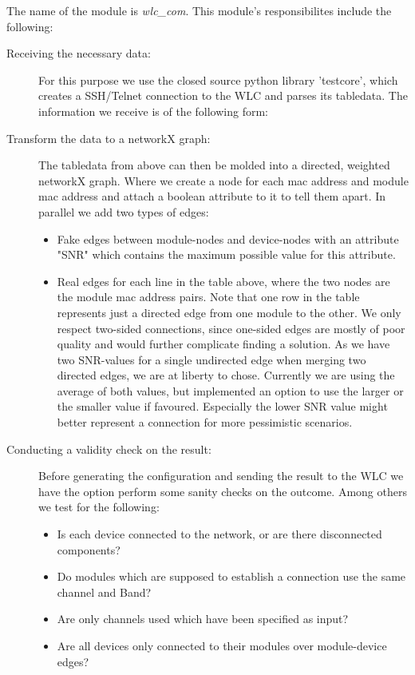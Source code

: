       The name of the module is \textit{wlc\_com}. This module's responsibilites include the following:
      \begin{description}
	\item[Receiving the necessary data:]
	  For this purpose we use the closed source python library 'testcore', which creates a SSH/Telnet connection to the WLC and parses its tabledata.
	  The information we receive is of the following form:
	
	\item [Transform the data to a networkX graph:]
	  The tabledata from above can then be molded into a directed, weighted networkX graph. Where we create a node for each mac address and module mac address and attach a boolean
	  attribute to it to tell them apart. 
	  In parallel we add two types of edges:

	  \begin{itemize}
	    \item Fake edges between module-nodes and device-nodes with an attribute "SNR" which contains the maximum possible value for this attribute.
	    
	    \item Real edges for each line in the table above, where the two nodes are the module mac address pairs. 
	      Note that one row in the table represents just a directed edge from one module to the other. We only respect two-sided connections,
	      since one-sided edges are mostly of poor quality and would further complicate finding a solution.
	      As we have two SNR-values for a single undirected edge when merging two directed edges, we are at liberty to chose.
	      Currently we are using the average of both values, but implemented an option to use the larger or the smaller value if favoured.
	      Especially the lower SNR value might better represent a connection for more pessimistic scenarios.
	  \end{itemize}

	\item[Conducting a validity check on the result:\newline]
	  Before generating the configuration and sending the result to the WLC we have the option perform some sanity checks on the outcome.
	  Among others we test for the following:
	  \begin{itemize}
	    \item Is each device connected to the network, or are there disconnected components?
	    \item Do modules which are supposed to establish a connection use the same channel and Band?
	    \item Are only channels used which have been specified as input?
	    \item Are all devices only connected to their modules over module-device edges?
	  \end{itemize}
	  

\end{description}
